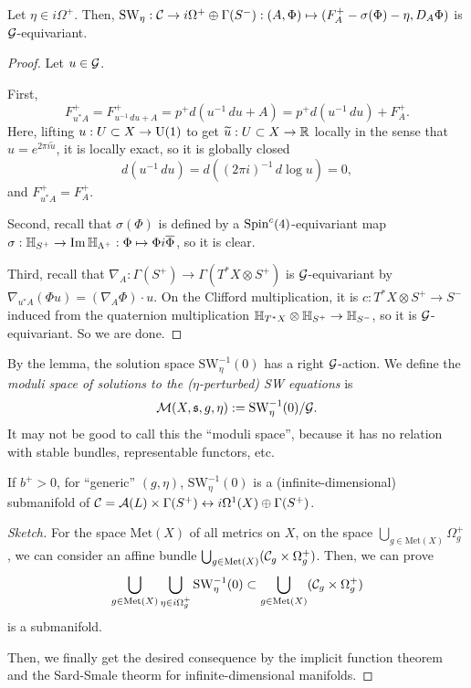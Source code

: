 \documentclass{../../../small}
\begin{document}
\begin{lemma}
Let $\eta\in i\Omega^+$.
Then, $\mathrm{SW}_\eta:\mathcal{C}\to i\Omega^+\oplus\Gamma(S^-):(A,\Phi)\mapsto(F_A^+-\sigma(\Phi)-\eta,D_A\Phi)$ is $\mathcal{G}$-equivariant.
\end{lemma}
\begin{proof}
Let $u\in\mathcal{G}$.

First,
\[F_{u^*A}^+=F_{u^{-1}\,du+A}^+=p^+d(u^{-1}\,du +A)=p^+d(u^{-1}\,du)+F_A^+.\]
Here, lifting $u:U\subset X\to\mathrm{U}(1)$ to get $\widetilde u:U\subset X\to\mathbb{R}$ locally in the sense that $u=e^{2\pi i\tilde u}$, it is locally exact, so it is globally closed
\[d(u^{-1}\,du)=d((2\pi i)^{-1}\,d\log u)=0,\]
and $F_{u^*A}^+=F_A^+$.

Second, recall that $\sigma(\Phi)$ is defined by a $\mathrm{Spin}^c(4)$-equivariant map $\sigma:\mathbb{H}_{S^+}\to\operatorname{Im}\mathbb{H}_{\Lambda^+}:\Phi\mapsto\Phi i\overline\Phi$, so it is clear.

Third, recall that $\nabla_A:\Gamma(S^+)\to\Gamma(T^*X\otimes S^+)$ is $\mathcal{G}$-equivariant by $\nabla_{u^*A}(\Phi u)=(\nabla_A\Phi)\cdot u$.
On the Clifford multiplication, it is $c:T^*X\otimes S^+\to S^-$ induced from the quaternion multiplication $\mathbb{H}_{T^*X}\otimes\mathbb{H}_{S^+}\to\mathbb{H}_{S^-}$, so it is $\mathcal{G}$-equivariant.
So we are done.
\end{proof}

By the lemma, the solution space $\mathrm{SW}_\eta^{-1}(0)$ has a right $\mathcal{G}$-action.
We define the \emph{moduli space of solutions to the ($\eta$-perturbed) SW equations} is
\[\mathcal{M}(X,\mathfrak{s},g,\eta):=\mathrm{SW}_\eta^{-1}(0)/\mathcal{G}.\]
It may not be good to call this the ``moduli space'', because it has no relation with stable bundles, representable functors, etc.

\begin{lemma}
If $b^+>0$, for ``generic'' $(g,\eta)$, $\mathrm{SW}_\eta^{-1}(0)$ is a (infinite-dimensional) submanifold of $\mathcal{C}=\mathcal{A}(L)\times\Gamma(S^+)\leftrightarrow i\Omega^1(X)\oplus\Gamma(S^+)$.
\end{lemma}
\begin{proof}[Sketch]
For the space $\mathrm{Met}(X)$ of all metrics on $X$, on the space $\bigcup_{g\in\mathrm{Met}(X)}\Omega_g^+$, we can consider an affine bundle $\bigcup_{g\in\mathrm{Met}(X)}(\mathcal{C}_g\times\Omega_g^+)$.
Then, we can prove
\[\bigcup_{g\in\mathrm{Met}(X)}\bigcup_{\eta\in i\Omega_g^+}\mathrm{SW}_\eta^{-1}(0)\subset\bigcup_{g\in\mathrm{Met}(X)}(\mathcal{C}_g\times\Omega_g^+)\]
is a submanifold.

Then, we finally get the desired consequence by the implicit function theorem and the Sard-Smale theorm for infinite-dimensional manifolds.
\end{proof}
\end{document}
